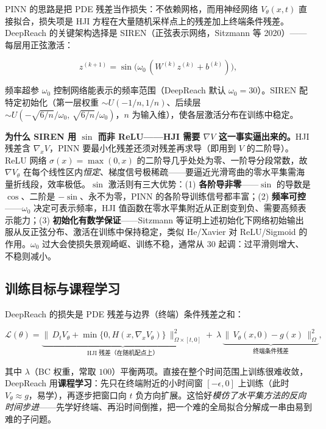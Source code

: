 PINN 的思路是把 PDE 残差当作损失：不依赖网格，而用神经网络 $V_\theta(x,t)$ 直接拟合，损失项是 HJI 方程在大量随机采样点上的残差加上终端条件残差。DeepReach 的关键架构选择是 SIREN（正弦表示网络，Sitzmann 等 2020\cite{sitzmann2020siren}）——每层用正弦激活：

\begin{equation}
  z^{(k+1)}=\sin\!\big(\omega_0\,(W^{(k)}z^{(k)}+b^{(k)})\big),
  \label{eq:hj-siren}
\end{equation}

频率超参 $\omega_0$ 控制网络能表示的频率范围（DeepReach 默认 $\omega_0=30$）。SIREN 配特定初始化（第一层权重 $\sim U(-1/n,1/n)$、后续层 $\sim U(-\sqrt{6/n}/\omega_0,\,\sqrt{6/n}/\omega_0)$，$n$ 为输入维），使各层激活分布在训练中稳定。

\begin{insight}
\textbf{为什么 SIREN 用 $\sin$ 而非 ReLU——HJI 需要 $\nabla V$ 这一事实逼出来的。}\;HJI 残差含 $\nabla_xV$，PINN 要最小化残差还须对残差再求导（即用到 $V$ 的二阶导）。ReLU 网络 $\sigma(x)=\max(0,x)$ 的二阶导几乎处处为零、一阶导分段常数，故 $\nabla V_\theta$ 在每个线性区内\emph{恒定}、梯度信号极稀疏——要逼近光滑弯曲的零水平集需海量折线段，效率极低。$\sin$ 激活则有三大优势：(1) \textbf{各阶导非零}——$\sin$ 的导数是 $\cos$、二阶是 $-\sin$、永不为零，PINN 的各阶导训练信号都丰富；(2) \textbf{频率可控}——$\omega_0$ 决定可表示频率，HJI 值函数在零水平集附近从正剧变到负、需要高频表示能力；(3) \textbf{初始化有数学保证}——Sitzmann 等证明上述初始化下网络初始输出服从反正弦分布、激活在训练中保持稳定，类似 He/Xavier 对 ReLU/Sigmoid 的作用。$\omega_0$ 过大会使损失景观崎岖、训练不稳，通常从 $30$ 起调：过平滑则增大、不稳则减小。
\end{insight}

\subsection{训练目标与课程学习}
\label{sec:hj-curriculum}

DeepReach 的损失是 PDE 残差与边界（终端）条件残差之和：

\begin{equation}
  \mathcal L(\theta)=\underbrace{\big\|\,D_tV_\theta+\min\{0,H(x,\nabla_xV_\theta)\}\,\big\|_{\Omega\times[t,0]}^{2}}_{\text{HJI 残差（在随机配点上）}}+\ \lambda\,\underbrace{\big\|\,V_\theta(x,0)-g(x)\,\big\|_{\Omega}^{2}}_{\text{终端条件残差}},
  \label{eq:hj-deepreach-loss}
\end{equation}

其中 $\lambda$（BC 权重，常取 $100$）平衡两项。直接在整个时间范围上训练很难收敛，DeepReach 用\textbf{课程学习}：先只在终端附近的小时间窗 $[-\epsilon,0]$ 上训练（此时 $V_\theta\approx g$，易学），再逐步把窗口向 $t$ 负方向扩展。这恰好\emph{模仿了水平集方法的反向时间步进}——先学好终端、再沿时间倒推，把一个难的全局拟合分解成一串由易到难的子问题。

